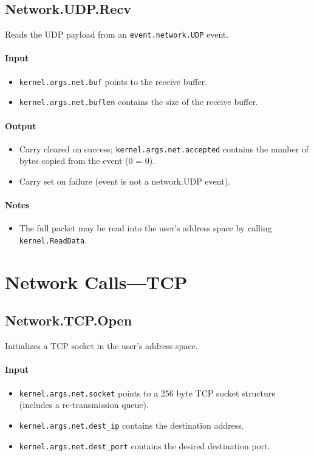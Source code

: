 \subsection*{Network.UDP.Recv}
Reads the UDP payload from an \verb+event.network.UDP+ event.

\paragraph{Input}
\begin{itemize}
\item \verb+kernel.args.net.buf+ points to the receive buffer.
\item \verb+kernel.args.net.buflen+ contains the size of the receive buffer.
\end{itemize}

\paragraph{Output}
\begin{itemize}
\item Carry cleared on success; \verb+kernel.args.net.accepted+ contains the number of bytes copied from the event (0 = 0).
\item Carry set on failure (event is not a network.UDP event).
\end{itemize}

\paragraph{Notes}
\begin{itemize}
\item The full packet may be read into the user's address space by calling \verb+kernel.ReadData+.
\end{itemize}

\section*{Network Calls---TCP}

\subsection*{Network.TCP.Open}
Initializes a TCP socket in the user's address space.

\paragraph{Input}
\begin{itemize}
\item \verb+kernel.args.net.socket+ points to a 256 byte TCP socket structure (includes a re-transmission queue).
\item \verb+kernel.args.net.dest_ip+ contains the destination address.
\item \verb+kernel.args.net.dest_port+ contains the desired destination port.
\end{itemize}

